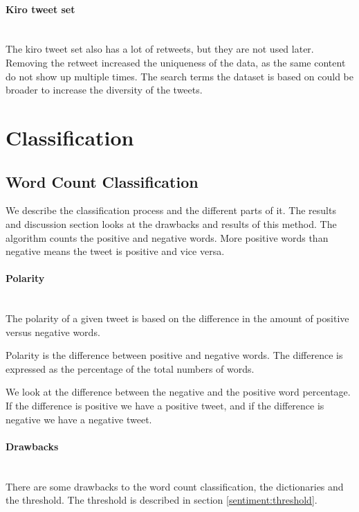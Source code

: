 \paragraph{Kiro tweet set}
\hspace{0pt}\\
The kiro tweet set also has a lot of retweets, but they are not used later.
Removing the retweet increased the uniqueness of the data, as the same content
do not show up multiple times. The search terms the dataset is based on
could be broader to increase the diversity of the tweets.
%

\section{Classification}\label{sentiment:classification}
\subsection{Word Count Classification}\label{sentiment:word_count_classification}
We describe the classification process and the different parts of it. The
results and discussion section looks at the drawbacks and results of this method.
The algorithm counts the positive and negative words. More positive words than
negative means the tweet is positive and vice versa. 

\paragraph{Polarity} 
\hspace{0pt}\\ 
The polarity of a given tweet is based on the difference in the amount of
positive versus negative words. 

Polarity is the difference between positive and negative words. The difference is
expressed as the percentage of the total numbers of words.  

We look at the difference between the negative and the positive word
percentage. If the difference is positive we have a positive tweet, and if the
difference is negative we have a negative tweet.

\paragraph{Drawbacks}
\hspace{0pt}\\
There are some drawbacks to the word count classification, the dictionaries
and the threshold. The threshold is described in section
\ref{sentiment:threshold}. 

